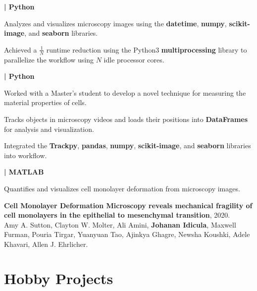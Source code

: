 \documentclass[]{jidicula-resume}
\begin{document}
\textbf{| Python}
\begin{tightemize}
\item Analyzes and visualizes microscopy images using the \textbf{datetime},
  \textbf{numpy}, \textbf{scikit-image}, and \textbf{seaborn} libraries.
\item Achieved a $\frac{1}{N}$ runtime reduction using the Python3 \textbf{multiprocessing} library to parallelize the workflow using $N$ idle processor cores.
\end{tightemize}
\sectionsep{}
\textbf{| Python}
\begin{tightemize}
  
\item Worked with a Master's student to develop a novel technique for measuring the material properties of cells.

\item Tracks objects in microscopy videos and loads their
  positions into \textbf{DataFrames} for analysis and visualization.
\item Integrated the \textbf{Trackpy}, \textbf{pandas}, \textbf{numpy},
  \textbf{scikit-image}, and \textbf{seaborn} libraries into workflow.
\end{tightemize}
\sectionsep{}
\textbf{| MATLAB}
\begin{tightemize}
\item Quantifies and visualizes cell monolayer deformation from microscopy
  images.
\item \textbf{Cell Monolayer Deformation Microscopy reveals mechanical fragility of cell monolayers in the epithelial to mesenchymal transition}, 2020.\\
  Amy A. Sutton, Clayton W. Molter, Ali Amini, \textbf{Johanan Idicula},
  Maxwell Furman, Pouria Tirgar, Yuanyuan Tao, Ajinkya Ghagre, Newsha Koushki, Adele Khavari, Allen J. Ehrlicher.

\end{tightemize}
\sectionsep{}

\newpage
\section{Hobby Projects}
\end{document}

